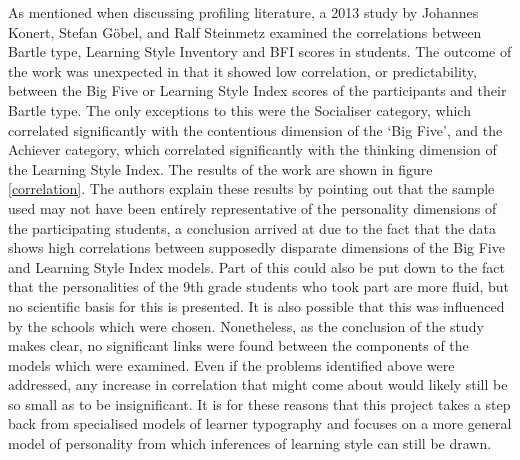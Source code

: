 \documentclass[12pt,a4paper,twoside]{report}
\begin{document}
As mentioned when discussing profiling literature, a 2013 study by Johannes Konert, Stefan G{\"o}bel, and Ralf Steinmetz \cite{konertmodeling} examined the correlations between Bartle type, Learning Style Inventory and BFI scores in students. The outcome of the work was unexpected in that it showed low correlation, or predictability, between the Big Five or Learning Style Index scores of the participants and their Bartle type. The only exceptions to this were the Socialiser category, which correlated significantly with the contentious dimension of the `Big Five', and the Achiever category, which correlated significantly with the thinking dimension of the Learning Style Index. The results of the work are shown in figure \ref{correlation}. The authors explain these results by pointing out that the sample used may not have been entirely representative of the personality dimensions of the participating students, a conclusion arrived at due to the fact that the data shows high correlations between supposedly disparate dimensions of the Big Five and Learning Style Index models. Part of this could also be put down to the fact that the personalities of the 9th grade students who took part are more fluid, but no scientific basis for this is presented. It is also possible that this was influenced by the schools which were chosen. Nonetheless, as the conclusion of the study makes clear, no significant links were found between the components of the models which were examined. Even if the problems identified above were addressed, any increase in correlation that might come about would likely still be so small as to be insignificant. It is for these reasons that this project takes a step back from specialised models of learner typography and focuses on a more general model of personality from which inferences of learning style can still be drawn.
\end{document}
